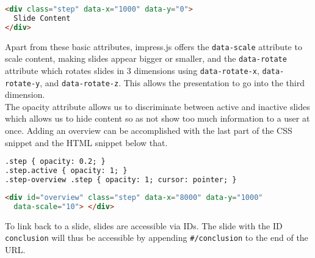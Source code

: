 \begin{frame}
\begin{module}[id=impressjs]
\begin{lstlisting}[language=HTML]
<div class="step" data-x="1000" data-y="0">
  Slide Content
</div>
\end{lstlisting}

\noindent
Apart from these basic attributes, impress.js offers the \texttt{data-scale} attribute to scale content, making slides appear bigger or smaller, and the \texttt{data-rotate} attribute which rotates slides in 3 dimensions using \texttt{data-rotate-x}, \texttt{data-rotate-y}, and \texttt{data-rotate-z}. This allows the presentation to go into the third dimension.\\
\noindent
The opacity attribute allows us to discriminate between active and inactive slides which allows us to hide content so as not show too much information to a user at once. Adding an overview can be accomplished with the last part of the CSS snippet and the HTML snippet below that.

\begin{lstlisting}[language=HTML]
.step { opacity: 0.2; }
.step.active { opacity: 1; }
.step-overview .step { opacity: 1; cursor: pointer; }
\end{lstlisting}

\begin{lstlisting}[language=HTML]
<div id="overview" class="step" data-x="8000" data-y="1000"
  data-scale="10"> </div>
\end{lstlisting}
\noindent
To link back to a slide, slides are accessible via IDs. The slide with the ID \texttt{conclusion} will thus be accessible by appending \texttt{\#/conclusion} to the end of the URL.

  \end{module}
\end{frame}

